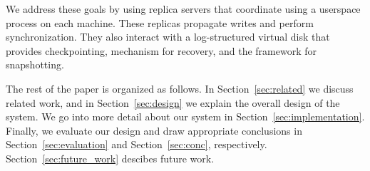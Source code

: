 We address these goals by using replica servers that coordinate using a
userspace process on each machine. These replicas propagate writes and 
perform synchronization. They also interact with a log-structured virtual 
disk that provides checkpointing, mechanism for recovery, and the 
framework for snapshotting. 

The rest of the paper is organized as follows. In Section~\ref{sec:related}
we discuss related work, and in Section~\ref{sec:design} we explain the 
overall design of the system. We go into more detail about our system in 
Section~\ref{sec:implementation}. Finally, we evaluate our design and draw
appropriate conclusions in Section~\ref{sec:evaluation} and 
Section~\ref{sec:conc}, respectively. Section~\ref{sec:future_work} descibes future work.
